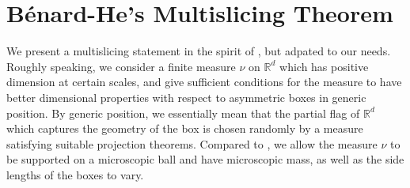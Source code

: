 \documentclass[11pt, leqno, fleqn]{amsart}
\def\eps{\varepsilon}
\def\cD{          \mathcal D}
\def \R{{\mathbb R}}
\def \Z{{\mathbb Z}}
\newcommand{\cP}{{\mathcal P}}
\newcommand{\aryst}{\begin{eqnarray*}}
\newcommand{\earyst}{\end{eqnarray*}}
\newtheorem{lemma}[thm]{\bf Lemma}
\theoremstyle{definition}
\DeclareMathOperator{\diff}{Diff}
\theoremstyle{definition}
\begin{document}
%
%		  
%		
%		
%		
%			
%		 
		 
		 
		 
		 \section{B\'enard-He's Multislicing Theorem} \label{sec BHMT}
		 
		 

		 		
		 		
		 We present a multislicing statement in the spirit of \cite{BH1, BH2}, but adpated to our needs. Roughly speaking, we consider a finite measure $\nu$ on $\R^d$ which has positive dimension at certain scales, and give sufficient conditions for the measure to have better dimensional properties with respect to asymmetric boxes in generic position. By generic position, we essentially mean that the partial flag of $\R^d$ which captures the geometry of the box is chosen randomly by a measure satisfying suitable projection theorems. Compared to \cite{BH2}, we allow the measure $\nu$ to be supported on a microscopic ball and have microscopic mass, as well as the side lengths of the boxes to vary. 
		 \smallskip
		 
\end{document}
